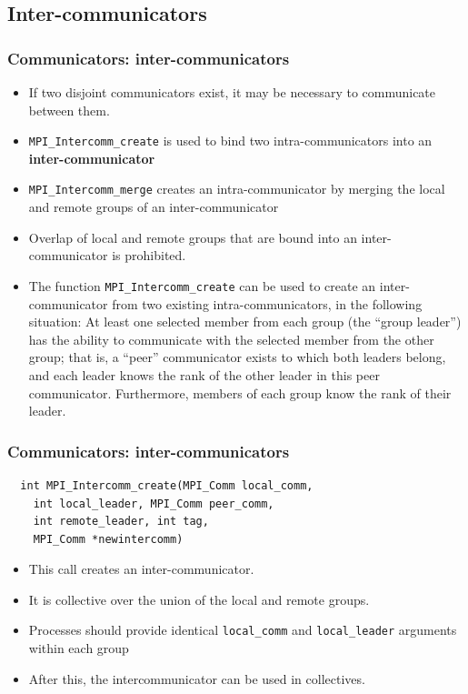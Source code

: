 \documentclass{beamer}
\begin{document}
\subsection{Inter-communicators}
\begin{frame}[fragile]
  \frametitle{Communicators: inter-communicators}
\begin{itemize}
\item If two disjoint communicators exist, it may be necessary to communicate between them.
\item {\color{mycolorcode}\verb|MPI_Intercomm_create|} is used to bind two intra-communicators into an {\color{mycolordef}\textbf{inter-communicator}}
\item {\color{mycolorcode}\verb|MPI_Intercomm_merge|} creates an intra-communicator by merging the local and remote groups of an inter-communicator
\item Overlap of local and remote groups that are bound into an inter-communicator is
prohibited. 
\item The function {\color{mycolorcode}\verb|MPI_Intercomm_create|} can be used to create an inter-communicator
from two existing intra-communicators, in the following situation: At least one selected
member from each group (the “group leader”) has the ability to communicate with the
selected member from the other group; that is, a “peer” communicator exists to which both
leaders belong, and each leader knows the rank of the other leader in this peer communicator.
Furthermore, members of each group know the rank of their leader.
\end{itemize}
\end{frame}

\begin{frame}[fragile]
  \frametitle{Communicators: inter-communicators}
{\color{mycolorcode}
\begin{verbatim}
  int MPI_Intercomm_create(MPI_Comm local_comm, 
    int local_leader, MPI_Comm peer_comm, 
    int remote_leader, int tag,
    MPI_Comm *newintercomm)
\end{verbatim}
}
\begin{itemize}
\item This call creates an inter-communicator. 
\item It is collective over the union of the local and
remote groups. 
\item Processes should provide identical {\color{mycolorcode}\verb|local_comm|} and {\color{mycolorcode}\verb|local_leader|} arguments
within each group
\item After this, the intercommunicator can be used in collectives.
\end{itemize}
\end{frame}
\end{document}

